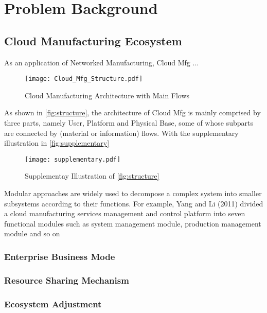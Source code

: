 \section{Problem Background} %
\label{sec:problem_background}

\subsection{Cloud Manufacturing Ecosystem} %
\label{sub:cloud_manufacturing_ecosystem}
As an application of Networked Manufacturing, Cloud Mfg ...
\begin{figure}[htbp]
\centering
\texttt{[image: Cloud\_Mfg\_Structure.pdf]}
\caption{Cloud Manufacturing Architecture with Main Flows}
\label{fig:structure}
\end{figure}





As shown in \autoref{fig:structure}, the architecture of Cloud Mfg is mainly comprised by three parts, namely User, Platform and Physical Base, some of whose subparts are connected by (material or information) flows. With the supplementary illustration in \autoref{fig:supplementary}

\begin{figure}[htbp]
\centering
\texttt{[image: supplementary.pdf]}
\caption{Supplementay Illustration of \autoref{fig:structure}}
\label{fig:supplementary}
\end{figure}

Modular approaches are widely used to decompose a complex system into smaller subsystems according to their functions. For example, Yang and Li (2011) divided a cloud manufacturing services management and control platform into seven functional modules such as system management module, production management module and so on

\subsubsection{Enterprise Business Mode}

\subsubsection{Resource Sharing Mechanism}

\subsubsection{Ecosystem Adjustment}


